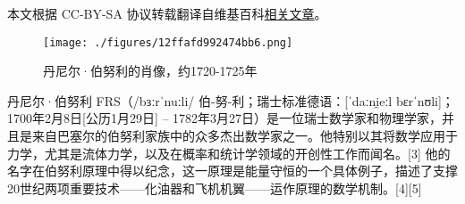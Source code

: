 
本文根据 CC-BY-SA 协议转载翻译自维基百科\href{https://en.wikipedia.org/wiki/Michael_Faraday}{相关文章}。

\begin{figure}[ht]
\centering
\texttt{[image: ./figures/12ffafd992474bb6.png]}
\caption{丹尼尔·伯努利的肖像，约1720-1725年} \label{fig_BNL_1}
\end{figure}
丹尼尔·伯努利 FRS（/bɜːrˈnuːli/ 伯-努-利；瑞士标准德语：[ˈdaːni̯eːl bɛrˈnʊli]；1700年2月8日[公历1月29日] – 1782年3月27日）是一位瑞士数学家和物理学家，并且是来自巴塞尔的伯努利家族中的众多杰出数学家之一。他特别以其将数学应用于力学，尤其是流体力学，以及在概率和统计学领域的开创性工作而闻名。[3] 他的名字在伯努利原理中得以纪念，这一原理是能量守恒的一个具体例子，描述了支撑20世纪两项重要技术——化油器和飞机机翼——运作原理的数学机制。[4][5]